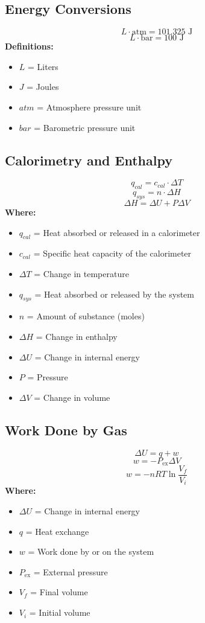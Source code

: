 \documentclass{report}
\begin{document}
\subsection*{Energy Conversions}
\[
L \cdot \text{atm} = 101.325 \text{ J}
\]
\[
L \cdot \text{bar} = 100 \text{ J}
\]
\textbf{Definitions:}
\begin{itemize}
    \item $L$ = Liters
    \item $J$ = Joules
    \item $atm$ = Atmosphere pressure unit
    \item $bar$ = Barometric pressure unit
\end{itemize}

\subsection*{Calorimetry and Enthalpy}
\[
q_{cal} = c_{cal} \cdot \Delta T
\]
\[
q_{sys} = n \cdot \Delta H
\]
\[
\Delta H = \Delta U + P \Delta V
\]
\textbf{Where:}
\begin{itemize}
    \item $q_{cal}$ = Heat absorbed or released in a calorimeter
    \item $c_{cal}$ = Specific heat capacity of the calorimeter
    \item $\Delta T$ = Change in temperature
    \item $q_{sys}$ = Heat absorbed or released by the system
    \item $n$ = Amount of substance (moles)
    \item $\Delta H$ = Change in enthalpy
    \item $\Delta U$ = Change in internal energy
    \item $P$ = Pressure
    \item $\Delta V$ = Change in volume
\end{itemize}

\subsection*{Work Done by Gas}
\[
\Delta U = q + w
\]
\[
w = -P_{\text{ex}}\Delta V
\]
\[
w = -nRT \ln \frac{V_f}{V_i}
\]
\textbf{Where:}
\begin{itemize}
    \item $\Delta U$ = Change in internal energy
    \item $q$ = Heat exchange
    \item $w$ = Work done by or on the system
    \item $P_{\text{ex}}$ = External pressure
    \item $V_f$ = Final volume
    \item $V_i$ = Initial volume
\end{itemize}
\end{document}
